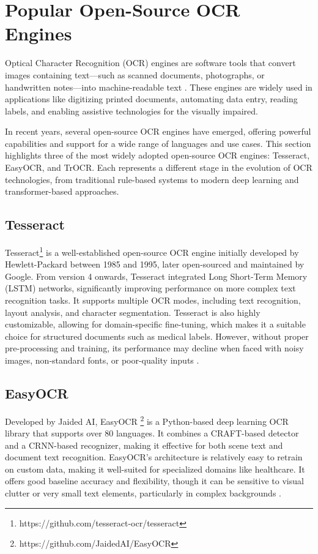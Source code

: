 \section{Popular Open-Source OCR Engines}
Optical Character Recognition (OCR) engines are software tools that convert images containing text—such as scanned documents, photographs, or handwritten notes—into machine-readable text \cite{Casey1996}. These engines are widely used in applications like digitizing printed documents, automating data entry, reading labels, and enabling assistive technologies for the visually impaired.

In recent years, several open-source OCR engines have emerged, offering powerful capabilities and support for a wide range of languages and use cases. This section highlights three of the most widely adopted open-source OCR engines: Tesseract, EasyOCR, and TrOCR. Each represents a different stage in the evolution of OCR technologies, from traditional rule-based systems to modern deep learning and transformer-based approaches.

\subsection*{Tesseract} Tesseract\footnote{https://github.com/tesseract-ocr/tesseract} is a well-established open-source OCR engine initially developed by Hewlett-Packard between 1985 and 1995, later open-sourced and maintained by Google. From version 4 onwards, Tesseract integrated Long Short-Term Memory (LSTM) networks, significantly improving performance on more complex text recognition tasks. It supports multiple OCR modes, including text recognition, layout analysis, and character segmentation. Tesseract is also highly customizable, allowing for domain-specific fine-tuning, which makes it a suitable choice for structured documents such as medical labels. However, without proper pre-processing and training, its performance may decline when faced with noisy images, non-standard fonts, or poor-quality inputs \cite{Smith2007}.

\subsection*{EasyOCR} Developed by Jaided AI\cite{JaidedAI2020}, EasyOCR \footnote{https://github.com/JaidedAI/EasyOCR} is a Python-based deep learning OCR library that supports over 80 languages. It combines a CRAFT-based detector and a CRNN-based recognizer, making it effective for both scene text and document text recognition. EasyOCR's architecture is relatively easy to retrain on custom data, making it well-suited for specialized domains like healthcare. It offers good baseline accuracy and flexibility, though it can be sensitive to visual clutter or very small text elements, particularly in complex backgrounds \cite{JaidedAI2020, Shi2016, Baek2019}.

